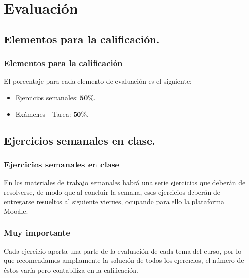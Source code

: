 \section{Evaluación}
\subsection{Elementos para la calificación.}

\begin{frame}
\frametitle{Elementos para la calificación}
El porcentaje para cada elemento de evaluación es el siguiente:
\begin{itemize}
\setlength{\itemsep}{0mm}
\item Ejercicios semanales: $\mathbf{50\%}$.
\item Exámenes - Tarea: $\mathbf{50\%}$.
\end{itemize}
\end{frame}

\subsection{Ejercicios semanales en clase.}

\begin{frame}
\frametitle{Ejercicios semanales en clase}
En los materiales de trabajo semanales habrá una serie ejercicios que deberán de resolverse, de modo que al concluir la semana, esos ejercicios deberán de entregarse resueltos al siguiente viernes, ocupando para ello la plataforma Moodle.
\end{frame}
\begin{frame}
\frametitle{Muy importante}
Cada ejercicio aporta una parte de la evaluación de cada tema del curso, por lo que recomendamos ampliamente la solución de todos los ejercicios, el número de éstos varía pero contabiliza en la calificación.
\end{frame}
